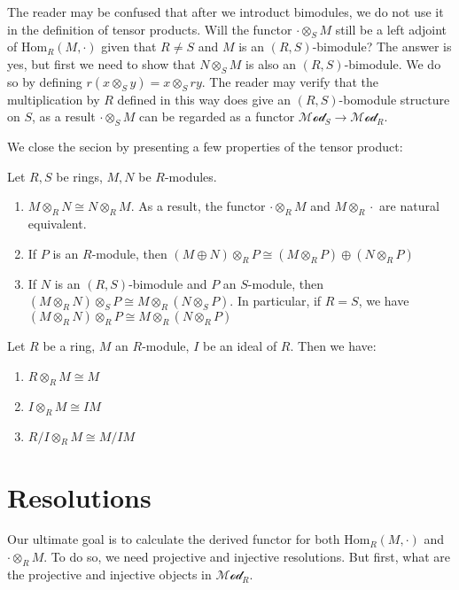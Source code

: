\documentclass{note-eng}
\begin{document}
The reader may be confused that after we introduct bimodules, we do not use it in the definition of tensor products. Will the functor $\cdot \otimes_S M$ still be a left adjoint of $\mathrm{Hom}_{R}(M, \cdot)$ given that $R \ne S$ and $M$ is an $(R, S)$-bimodule? The answer is yes, but first we need to show that $N \otimes_S M$ is also an $(R, S)$-bimodule. We do so by defining $r(x \otimes_S y) = x \otimes_S ry$. The reader may verify that the multiplication by $R$ defined in this way does give an $(R, S)$-bomodule structure on $S$, as a result $\cdot \otimes_S M$ can be regarded as a functor $\mathscr{Mod}_S \rightarrow \mathscr{Mod}_R$.

We close the secion by presenting a few properties of the tensor product:

\begin{proposition}
    Let $R, S$ be rings, $M, N$ be $R$-modules.
    \begin{enumerate}
        \item $M \otimes_R N \cong N \otimes_R M$. As a result, the functor $\cdot \otimes_R M$ and $M \otimes_R \cdot$ are natural equivalent.
        \item If $P$ is an $R$-module, then $(M \oplus N) \otimes_R P \cong (M \otimes_R P) \oplus (N \otimes_R P)$
        \item If $N$ is an $(R, S)$-bimodule and $P$ an $S$-module, then $(M \otimes_R N) \otimes_S P \cong M \otimes_R (N \otimes_S P)$. In particular, if $R = S$, we have $(M \otimes_R N) \otimes_R P \cong M \otimes_R (N \otimes_R P)$
    \end{enumerate}
\end{proposition}

\begin{proposition}
    Let $R$ be a ring, $M$ an $R$-module, $I$ be an ideal of $R$. Then we have:
    \begin{enumerate}
        \item $R \otimes_R M \cong M$
        \item $I \otimes_R M \cong IM$
        \item $R / I \otimes_R M \cong M / IM$
    \end{enumerate}
\end{proposition}

\section{Resolutions}

Our ultimate goal is to calculate the derived functor for both $\mathrm{Hom}_{R}(M, \cdot)$ and $\cdot \otimes_R M$. To do so, we need projective and injective resolutions. But first, what are the projective and injective objects in $\mathscr{Mod}_R$.
\end{document}
